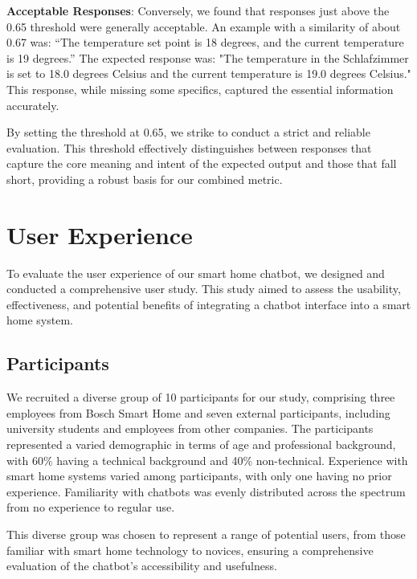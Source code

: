 \textbf{Acceptable Responses}: Conversely, we found that responses just above the 0.65 threshold were generally acceptable. An example with a similarity of about 0.67 was: ``The temperature set point is 18 degrees, and the current temperature is 19 degrees.'' The expected response was: "The temperature in the Schlafzimmer is set to 18.0 degrees Celsius and the current temperature is 19.0 degrees Celsius." This response, while missing some specifics, captured the essential information accurately.

By setting the threshold at 0.65, we strike to conduct a strict and reliable evaluation. This threshold effectively distinguishes between responses that capture the core meaning and intent of the expected output and those that fall short, providing a robust basis for our combined metric.



\section{User Experience}

To evaluate the user experience of our smart home chatbot, we designed and conducted a comprehensive user study. This study aimed to assess the usability, effectiveness, and potential benefits of integrating a chatbot interface into a smart home system.

\subsection{Participants}
We recruited a diverse group of 10 participants for our study, comprising three employees from Bosch Smart Home and seven external participants, including university students and employees from other companies. The participants represented a varied demographic in terms of age and professional background, with 60\% having a technical background and 40\% non-technical. Experience with smart home systems varied among participants, with only one having no prior experience. Familiarity with chatbots was evenly distributed across the spectrum from no experience to regular use.

This diverse group was chosen to represent a range of potential users, from those familiar with smart home technology to novices, ensuring a comprehensive evaluation of the chatbot's accessibility and usefulness.

